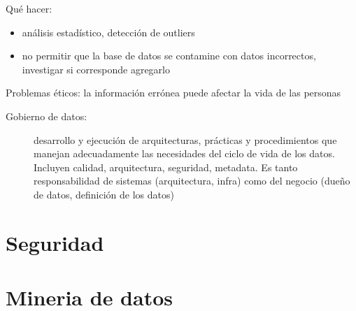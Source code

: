 Qué hacer:

\begin{itemize}
	\item análisis estadístico, detección de outliers
	\item no permitir que la base de datos se contamine con datos incorrectos, investigar si corresponde agregarlo
\end{itemize}

Problemas éticos: la información errónea puede afectar la vida de las personas

\begin{description}
	\item[Gobierno de datos:] desarrollo y ejecución de arquitecturas, prácticas y procedimientos que manejan adecuadamente las necesidades del ciclo de vida de los datos. Incluyen calidad, arquitectura, seguridad, metadata. Es tanto responsabilidad de sistemas (arquitectura, infra) como del negocio (dueño de datos, definición de los datos)
\end{description}

\section{Seguridad}

\section{Mineria de datos}
